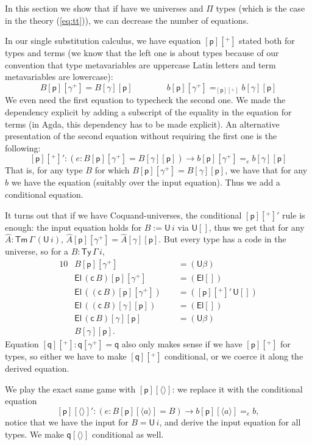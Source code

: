 \documentclass[sigplan,10pt,anonymous,review]{acmart}\settopmatter{printfolios=true,printccs=false,printacmref=false}
\newcommand{\ra}{\rightarrow}
\newcommand{\Ty}{\mathsf{Ty}}
\newcommand{\Tm}{\mathsf{Tm}}
\newcommand{\p}{\mathsf{p}}
\newcommand{\q}{\mathsf{q}}
\newcommand{\U}{\mathsf{U}}
\newcommand{\El}{\mathsf{El}}
\newcommand{\cd}{\mathsf{c}}
\begin{document}
In this section we show that if have we universes and $\Pi$ types
(which is the case in the theory (\ref{eq:tt})), we can decrease the
number of equations.

In our single substitution calculus, we have equation $[\p][^+]$
stated both for types and terms (we know that the left one is about
types because of our convention that type metavariables are uppercase
Latin letters and term metavariables are lowercase):
\[
B[\p][\gamma^+] = B[\gamma][\p] \hspace{4em} b[\p][\gamma^+] =_{[\p][^+]} b[\gamma][\p]
\]
We even need the first equation to typecheck the second one. We made
the dependency explicit by adding a subscript of the equality in the
equation for terms (in Agda, this dependency has to be made
explicit). An alternative presentation of the second equation without
requiring the first one is the following:
\[
[\p][^+]' : (e : B[\p][\gamma^+] = B[\gamma][\p])\ra b[\p][\gamma^+] =_{e} b[\gamma][\p]
\]
That is, for any type $B$ for which $B[\p][\gamma^+] = B[\gamma][\p]$,
we have that for any $b$ we have the equation (suitably over the input
equation). Thus we add a conditional equation.

It turns out that if we have Coquand-universes, the conditional
$[\p][^+]'$ rule is enough: the input equation holds for $B := \U\,i$
via $\U[]$, thus we get that for any $\hat{A} : \Tm\,\Gamma\,(\U\,i)$,
$\hat{A}[\p][\gamma^+] = \hat{A}[\gamma][\p]$. But every type has a
code in the universe, so for a $B : \Ty\,\Gamma\,i$,
\begin{alignat*}{10}
  & B[\p][\gamma^+] && {=}(\U\beta) \\
  & \El\,(\cd\,B)[\p][\gamma^+] && {=}(\El[]) \\
  & \El\,((\cd\,B)[\p][\gamma^+])\,\, && {=}([\p][^+]'\,\U[]) \\
  & \El\,((\cd\,B)[\gamma][\p]) && {=}(\El[]) \\
  & \El\,(\cd\,B)[\gamma][\p] && {=}(\U\beta) \\
  & B[\gamma][\p].
\end{alignat*}
Equation $[\q][^+] : \q[\gamma^+] = \q$ also only makes sense if we
have $[\p][^+]$ for types, so either we have to make $[\q][^+]$
conditional, or we coerce it along the derived equation.

We play the exact same game with $[\p][\langle\rangle]$: we replace it
with the conditional equation
\[
[\p][\langle\rangle]' : (e:B[\p][\langle a\rangle] = B)\ra b[\p][\langle a\rangle] =_e b,
\]
notice that we have the input for $B = \U\,i$, and derive the input
equation for all types. We make $\q[\langle\rangle]$ conditional as
well.
\end{document}

